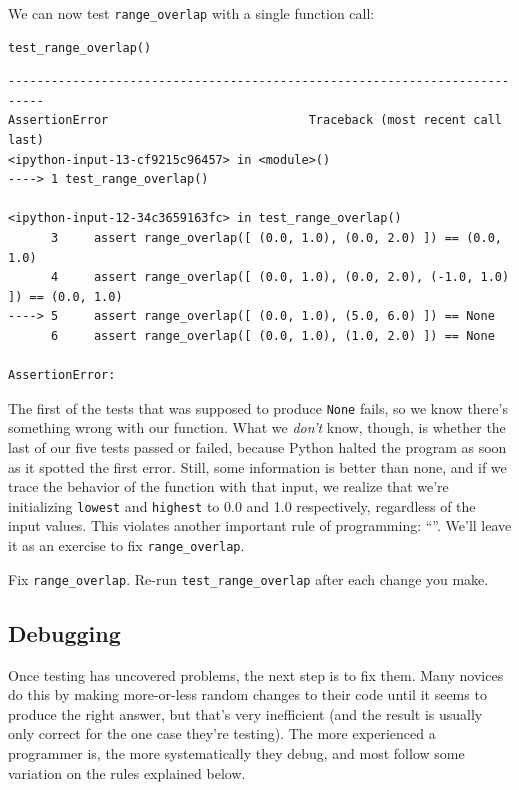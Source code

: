 \documentclass{book}
\begin{document}
We can now test \texttt{range\_overlap} with a single function call:

\begin{verbatim}
test_range_overlap()
\end{verbatim}

\begin{verbatim}
---------------------------------------------------------------------------
AssertionError                            Traceback (most recent call last)
<ipython-input-13-cf9215c96457> in <module>()
----> 1 test_range_overlap()

<ipython-input-12-34c3659163fc> in test_range_overlap()
      3     assert range_overlap([ (0.0, 1.0), (0.0, 2.0) ]) == (0.0, 1.0)
      4     assert range_overlap([ (0.0, 1.0), (0.0, 2.0), (-1.0, 1.0) ]) == (0.0, 1.0)
----> 5     assert range_overlap([ (0.0, 1.0), (5.0, 6.0) ]) == None
      6     assert range_overlap([ (0.0, 1.0), (1.0, 2.0) ]) == None

AssertionError: 
\end{verbatim}

The first of the tests that was supposed to produce \texttt{None} fails,
so we know there's something wrong with our function. What we
\emph{don't} know, though, is whether the last of our five tests passed
or failed, because Python halted the program as soon as it spotted the
first error. Still, some information is better than none, and if we
trace the behavior of the function with that input, we realize that
we're initializing \texttt{lowest} and \texttt{highest} to 0.0 and 1.0
respectively, regardless of the input values. This violates another
important rule of programming:
``''. We'll leave it as an exercise to fix
\texttt{range\_overlap}.

\begin{challenge}
  Fix \texttt{range\_overlap}. Re-run \texttt{test\_range\_overlap}
  after each change you make.
\end{challenge}

\subsection{Debugging}

Once testing has uncovered problems, the next step is to fix them. Many
novices do this by making more-or-less random changes to their code
until it seems to produce the right answer, but that's very inefficient
(and the result is usually only correct for the one case they're
testing). The more experienced a programmer is, the more systematically
they debug, and most follow some variation on the rules explained below.
\end{document}
